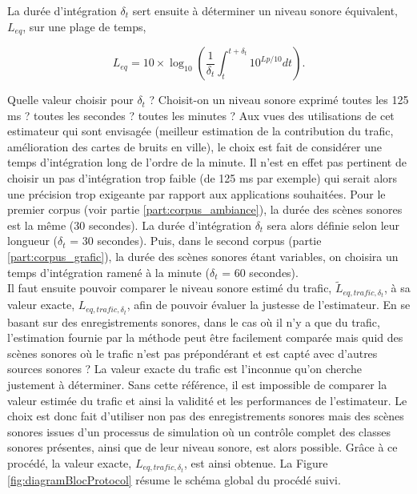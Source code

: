 La durée d'intégration $\delta_t$ sert ensuite à déterminer un niveau sonore équivalent, $L_{eq}$, sur une plage de temps,

\begin{equation}
L_{eq} = 10 \times \log_{10}\left(\frac{1}{\delta_t} \int_t^{t+\delta_t} 10^{Lp/10} dt \right).
\end{equation}

Quelle valeur choisir pour $\delta_t$ ? Choisit-on un niveau sonore exprimé toutes les 125 ms ? toutes les secondes ? toutes les minutes ? Aux vues des utilisations de cet estimateur qui sont envisagée (meilleur estimation de la contribution du trafic, amélioration des cartes de bruits en ville), le choix est fait de considérer une temps d'intégration long de l'ordre de la minute. Il n'est en effet pas pertinent de choisir un pas d'intégration trop faible (de 125 ms par exemple) qui serait alors une précision trop exigeante par rapport aux applications souhaitées. 
Pour le premier corpus (voir partie \ref{part:corpus_ambiance}), la durée des scènes sonores est la même (30 secondes). La durée d'intégration $\delta_t$  sera alors définie selon leur longueur ($\delta_t$ = 30 secondes). Puis, dans le second corpus (partie \ref{part:corpus_grafic}), la durée des scènes sonores étant variables, on choisira un temps d'intégration ramené à la minute ($\delta_t$ = 60 secondes).\\

Il faut ensuite pouvoir comparer le niveau sonore estimé du trafic, $\tilde{L}_{eq,trafic, \delta_t}$, à sa valeur exacte, $L_{eq,trafic, \delta_t}$, afin de pouvoir évaluer la justesse de l'estimateur. En se basant sur des enregistrements sonores, dans le cas où il n'y a que du trafic, l'estimation fournie par la méthode peut être facilement comparée mais quid des scènes sonores où le trafic n'est pas prépondérant et est capté avec d'autres sources sonores ? La valeur exacte du trafic est l'inconnue qu'on cherche justement à déterminer. Sans cette référence, il est impossible de comparer la valeur estimée du trafic et ainsi la validité et les performances de l'estimateur.
Le choix est donc fait d'utiliser non pas des enregistrements sonores mais des scènes sonores issues d'un processus de simulation où un contrôle complet des classes sonores présentes, ainsi que de leur niveau sonore, est alors possible. Grâce à ce procédé, la valeur exacte, $L_{eq,trafic,\delta_t}$, est ainsi obtenue. La Figure \ref{fig:diagramBlocProtocol} résume le schéma global du procédé suivi.

